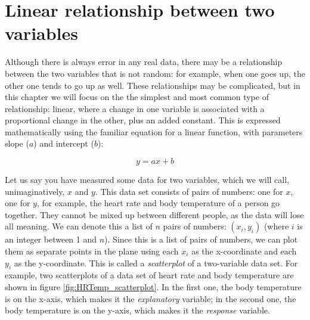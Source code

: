\documentclass[
  letterpaper,
  DIV=11,
  numbers=noendperiod]{scrreprt}
\begin{document}
\hypertarget{linear-relationship-between-two-variables}{%
\section{Linear relationship between two
variables}\label{linear-relationship-between-two-variables}}

\label{sec:model8}

Although there is always error in any real data, there may be a
relationship between the two variables that is not random: for example,
when one goes up, the other one tends to go up as well. These
relationships may be complicated, but in this chapter we will focus on
the the simplest and most common type of relationship: linear, where a
change in one variable is associated with a proportional change in the
other, plus an added constant. This is expressed mathematically using
the familiar equation for a linear function, with parameters slope
(\(a\)) and intercept (\(b\)):

\[ y = ax + b\]

Let us say you have measured some data for two variables, which we will
call, unimaginatively, \(x\) and \(y\). This data set consists of pairs
of numbers: one for \(x\), one for \(y\), for example, the heart rate
and body temperature of a person go together. They cannot be mixed up
between different people, as the data will lose all meaning. We can
denote this a list of \(n\) pairs of numbers: \((x_i, y_i)\) (where
\(i\) is an integer between 1 and \(n\)). Since this is a list of pairs
of numbers, we can plot them as separate points in the plane using each
\(x_i\) as the x-coordinate and each \(y_i\) as the y-coordinate. This
is called a  \emph{scatterplot} of a two-variable
data set. For example, two scatterplots of a data set of heart rate and
body temperature are shown in figure \ref{fig:HRTemp_scatterplot}. In
the first one, the body temperature is on the x-axis, which makes it the
 \emph{explanatory} variable; in the second
one, the body temperature is on the y-axis, which makes it the
 \emph{response} variable.
\end{document}
